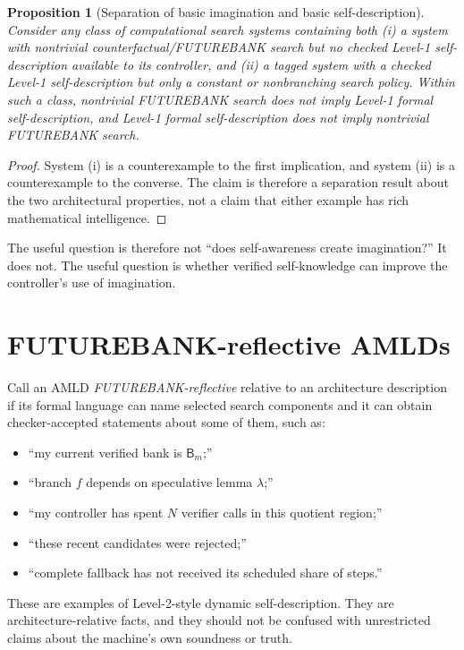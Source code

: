\documentclass[11pt,openany]{book}
\newtheorem{proposition}[theorem]{Proposition}
\theoremstyle{definition}
\theoremstyle{remark}
\newcommand{\Bank}{\mathsf{B}}
\begin{document}
\begin{proposition}[Separation of basic imagination and basic self-description]\label{prop:independentaxes}
Consider any class of computational search systems containing both (i) a system with nontrivial counterfactual/FUTUREBANK search but no checked Level-1 self-description available to its controller, and (ii) a tagged system with a checked Level-1 self-description but only a constant or nonbranching search policy. Within such a class, nontrivial FUTUREBANK search does not imply Level-1 formal self-description, and Level-1 formal self-description does not imply nontrivial FUTUREBANK search.
\end{proposition}
\begin{proof}
System (i) is a counterexample to the first implication, and system (ii) is a counterexample to the converse. The claim is therefore a separation result about the two architectural properties, not a claim that either example has rich mathematical intelligence.
\end{proof}

The useful question is therefore not ``does self-awareness create imagination?'' It does not. The useful question is whether verified self-knowledge can improve the controller's use of imagination.

\section{FUTUREBANK-reflective AMLDs}
Call an AMLD \emph{FUTUREBANK-reflective} relative to an architecture description if its formal language can name selected search components and it can obtain checker-accepted statements about some of them, such as:
\begin{itemize}
\item ``my current verified bank is $\Bank_m$;''
\item ``branch $f$ depends on speculative lemma $\lambda$;''
\item ``my controller has spent $N$ verifier calls in this quotient region;''
\item ``these recent candidates were rejected;''
\item ``complete fallback has not received its scheduled share of steps.''
\end{itemize}
These are examples of Level-2-style dynamic self-description. They are architecture-relative facts, and they should not be confused with unrestricted claims about the machine's own soundness or truth.
\end{document}
